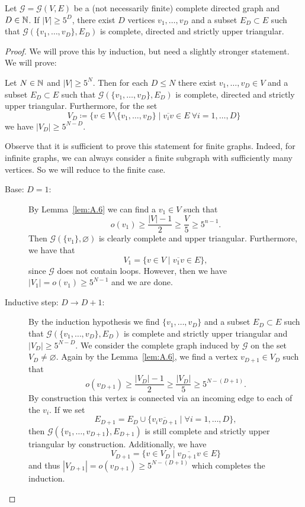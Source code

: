\begin{lemma}[{\cite[Lemma~A.8]{MR3509968}}]
  \label{lem:A.8}
  Let \(\mathcal{G} = \mathcal{G}(V,E)\) be a (not necessarily finite) complete directed graph and \(D \in \mathbb{N}\). If \(|V| \geq 5^D\), there exist \(D\) vertices \(v_1, \dots, v_D\) and a subset \(E_D \subset E\) such that \(\mathcal{G}(\{v_1, \dots, v_D\}, E_D)\) is complete, directed and strictly upper triangular.
\end{lemma}

\begin{proof}
  We will prove this by induction, but need a slightly stronger statement. We will prove:

  Let \(N \in \mathbb{N}\) and \(|V| \geq 5^N\). Then for each \(D \leq N\) there exist \(v_1,\dots, v_D \in V\) and a subset \(E_D \subset E\) such that \(\mathcal{G}(\{v_1, \dots, v_D\}, E_D)\) is complete, directed and strictly upper triangular. Furthermore, for the set
  \[
    V_D \coloneqq \{v \in V \setminus \{v_1, \dots, v_D\} \mid \overline{v_iv} \in E\ \forall i =1,\dots, D\}
  \]
  we have \(|V_D| \geq 5^{N-D}\).

  Observe that it is sufficient to prove this statement for finite graphs. Indeed, for infinite graphs, we can always consider a finite subgraph with sufficiently many vertices. So we will reduce to the finite case.
  \begin{description}
  \item[Base: \(D = 1\):] By Lemma~\ref{lem:A.6} we can find a \(v_1 \in V\) such that
    \[
      o(v_1) \geq \frac{|V| - 1}{2} \geq \frac{V}{5} \geq 5^{n-1}.
    \]
    Then \(\mathcal{G}(\{v_1\}, \varnothing)\) is clearly complete and upper triangular. Furthermore, we have that
    \[
      V_1 = \{v \in V \mid \overline{v_1v} \in E\},
    \]
    since \(\mathcal{G}\) does not contain loops. However, then we have \(|V_1| = o(v_1) \geq 5^{N-1}\) and we are done.
  \item[Inductive step: \(D \to D+1\):] By the induction hypothesis we find \(\{v_1, \dots, v_D\}\) and a subset \(E_D \subset E\) such that \(\mathcal{G}(\{v_1, \dots, v_D\}, E_D)\) is complete and strictly upper triangular and \(|V_D| \geq 5^{N-D}\). We consider the complete graph induced by \(\mathcal{G}\) on the set \(V_D \neq \varnothing\). Again by the Lemma~\ref{lem:A.6}, we find a vertex \(v_{D+1} \in V_D\) such that
    \[
      o(v_{D+1}) \geq \frac{|V_D| -1}{2} \geq \frac{|V_D|}{5} \geq 5^{N - (D+1)}.
    \]
    By construction this vertex is connected via an incoming edge to each of the \(v_i\). If we set
    \[
      E_{D+1} = E_D \cup \{\overline{v_iv_{D+1}} \mid \forall i = 1, \dots, D\},
    \]
    then \(\mathcal{G}(\{v_1, \dots, v_{D+1}\}, E_{D+1})\) is still complete and strictly upper triangular by construction. Additionally, we have
    \[
      V_{D+1} = \{v \in V_D \mid \overline{v_{D+1}v} \in E\}
    \]
    and thus \(|V_{D+1}| = o(v_{D+1}) \geq 5^{N- (D+1)}\) which completes the induction.
  \end{description}
\end{proof}

